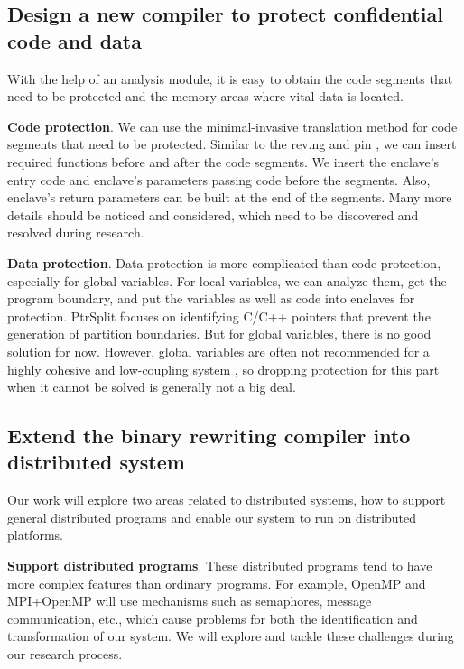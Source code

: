 \subsection{Design a new compiler to protect confidential code and data}
\label{sec:ToolToRewrite}
With the help of an analysis module, it is easy to obtain the code segments that need
to be protected and the memory areas where vital data is located.

\textbf{Code protection}. We can use the minimal-invasive translation method for
code segments that need to be protected. Similar to the rev.ng \cite{Federico2017revngAU}
and pin \cite{Luk2005PinBC}, we can insert required functions before and
after the code segments. We insert the enclave's entry code and enclave's parameters passing code
before the segments. Also, enclave's return parameters can be built at the end of the segments.
Many more details should be noticed and considered, which need to be
discovered and resolved during research.

\textbf{Data protection}. Data protection is more complicated than code protection,
especially for global variables.
For local variables, we can analyze them, get the program boundary,
and put the variables as well as code into enclaves for protection.
PtrSplit \cite{Liu2017PtrSplitSG} focuses on identifying C/C++ pointers
that prevent the generation of partition boundaries.
But for global variables, there is no good solution for now. However,
global variables are often not recommended for a highly cohesive and low-coupling system
\cite{GlobalVariablesAreBad, GlobalVariablesAreEvil},
so dropping protection for this part when it cannot be solved is generally not a big deal.

\subsection{Extend the binary rewriting compiler into distributed system}
\label{sec:ToolToDistributedSystem}
Our work will explore two areas related to distributed systems, how to support general distributed
programs and enable our system to run on distributed platforms.

\textbf{Support distributed programs}.
These distributed programs tend to have more complex features than ordinary programs.
For example, OpenMP \cite{Dagum1998OpenMPAI} and MPI+OpenMP \cite{Klinkenberg2020CHAMELEONRL}
will use mechanisms such as semaphores, message communication, etc., which cause problems
for both the identification and transformation of our system.
We will explore and tackle these challenges during our research process.

